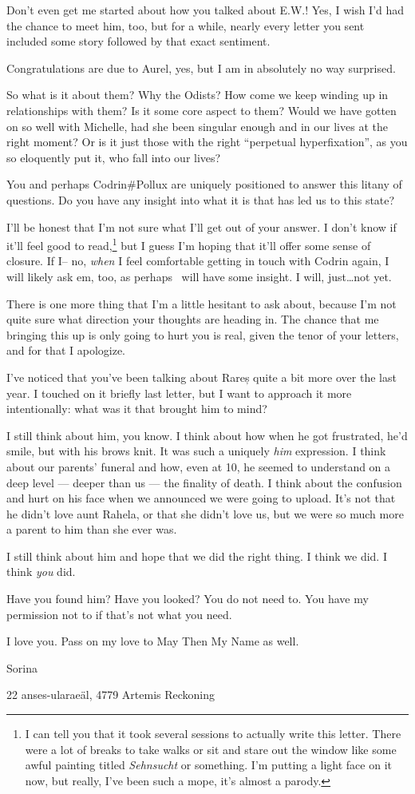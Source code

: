 Don't even get me started about how you talked about E.W.! Yes, I wish I'd had the chance to meet him, too, but for a while, nearly every letter you sent included some story followed by that exact sentiment.

Congratulations are due to Aurel, yes, but I am in absolutely no way surprised.

So what is it about them? Why the Odists? How come we keep winding up in relationships with them? Is it some core aspect to them? Would we have gotten on so well with Michelle, had she been singular enough and in our lives at the right moment? Or is it just those with the right ``perpetual hyperfixation'', as you so eloquently put it, who fall into our lives?

You and perhaps Codrin\#Pollux are uniquely positioned to answer this litany of questions. Do you have any insight into what it is that has led us to this state?

I'll be honest that I'm not sure what I'll get out of your answer. I don't know if it'll feel good to read,\footnote{I can tell you that it took several sessions to actually write this letter. There were a lot of breaks to take walks or sit and stare out the window like some awful painting titled \emph{Sehnsucht} or something. I'm putting a light face on it now, but really, I've been such a mope, it's almost a parody.} but I guess I'm hoping that it'll offer some sense of closure. If I-- no, \emph{when} I feel comfortable getting in touch with Codrin again, I will likely ask em, too, as perhaps \Partner \ will have some insight. I will, just\ldots not yet.

There is one more thing that I'm a little hesitant to ask about, because I'm not quite sure what direction your thoughts are heading in. The chance that me bringing this up is only going to hurt you is real, given the tenor of your letters, and for that I apologize.

I've noticed that you've been talking about Rareș quite a bit more over the last year. I touched on it briefly last letter, but I want to approach it more intentionally: what was it that brought him to mind?

I still think about him, you know. I think about how when he got frustrated, he'd smile, but with his brows knit. It was such a uniquely \emph{him} expression. I think about our parents' funeral and how, even at 10, he seemed to understand on a deep level — deeper than us — the finality of death. I think about the confusion and hurt on his face when we announced we were going to upload. It's not that he didn't love aunt Rahela, or that she didn't love us, but we were so much more a parent to him than she ever was.

I still think about him and hope that we did the right thing. I think we did. I think \emph{you} did.

Have you found him? Have you looked? You do not need to. You have my permission not to if that's not what you need.

I love you. Pass on my love to May Then My Name as well.

Sorina

22 anses-ularaeäl, 4779 Artemis Reckoning
